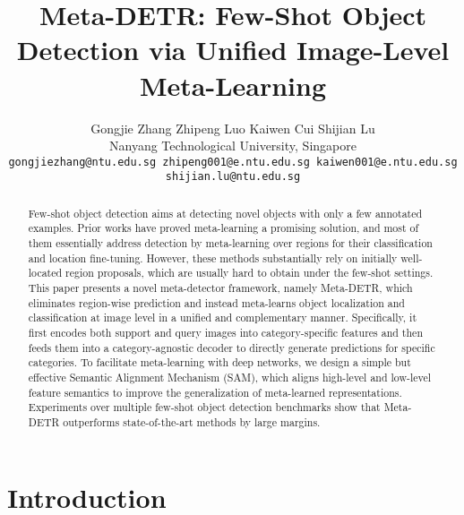 \documentclass[10pt,twocolumn,letterpaper]{article}
\begin{document}
\title{Meta-DETR: Few-Shot Object Detection via Unified Image-Level Meta-Learning}


\author{
Gongjie Zhang \qquad Zhipeng Luo \qquad Kaiwen Cui \qquad Shijian Lu \smallskip\\
{Nanyang Technological University, Singapore}\\
{\tt\footnotesize gongjiezhang@ntu.edu.sg \quad zhipeng001@e.ntu.edu.sg \quad kaiwen001@e.ntu.edu.sg \quad shijian.lu@ntu.edu.sg}
}


\maketitle
\ificcvfinal\thispagestyle{empty}\fi


\begin{abstract}
Few-shot object detection aims at detecting novel objects with only a few annotated examples. Prior works have proved meta-learning a promising solution, and most of them essentially address detection by meta-learning over regions for their classification and location fine-tuning. However, these methods substantially rely on initially well-located region proposals, which are usually hard to obtain under the few-shot settings. This paper presents a novel meta-detector framework, namely Meta-DETR, which eliminates region-wise prediction and instead meta-learns object localization and classification at image level in a unified and complementary manner. Specifically, it first encodes both support and query images into category-specific features and then feeds them into a category-agnostic decoder to directly generate predictions for specific categories. To facilitate meta-learning with deep networks, we design a simple but effective Semantic Alignment Mechanism (SAM), which aligns high-level and low-level feature semantics to improve the generalization of meta-learned representations. Experiments over multiple few-shot object detection benchmarks show that Meta-DETR outperforms state-of-the-art methods by large margins.
\end{abstract}



\section{Introduction} \label{sec:introduction}
\vspace*{-1.8mm}
\end{document}
